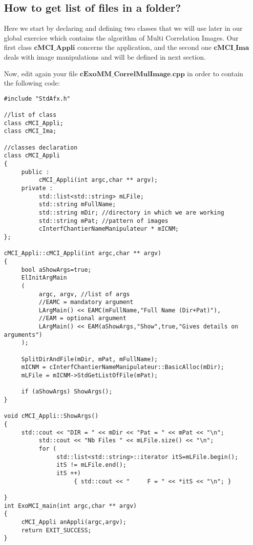\subsection{How to get list of files in a folder?}
Here we start by declaring and defining two classes that we will use later in our global exercice which contains the algorithm of Multi Correlation Images. Our first class $\textbf{cMCI\_Appli}$ concerns the application, and the second one $\textbf{cMCI\_Ima}$ deals with image manipulations and will be defined in next section. \newline

Now, edit again your file $\textbf{cExoMM\_CorrelMulImage.cpp}$ in order to contain the following code:

\begin{verbatim}
#include "StdAfx.h" 

//list of class 
class cMCI_Appli; 
class cMCI_Ima; 

//classes declaration 
class cMCI_Appli 
{ 
     public : 
          cMCI_Appli(int argc,char ** argv); 
     private : 
          std::list<std::string> mLFile; 
          std::string mFullName; 
          std::string mDir; //directory in which we are working 
          std::string mPat; //pattern of images 
          cInterfChantierNameManipulateur * mICNM; 
}; 

cMCI_Appli::cMCI_Appli(int argc,char ** argv) 
{ 
     bool aShowArgs=true; 
     ElInitArgMain 
     ( 
          argc, argv, //list of args
          //EAMC = mandatory argument 
          LArgMain() << EAMC(mFullName,"Full Name (Dir+Pat)"),
          //EAM = optional argument 
          LArgMain() << EAM(aShowArgs,"Show",true,"Gives details on arguments")
     ); 

     SplitDirAndFile(mDir, mPat, mFullName); 
     mICNM = cInterfChantierNameManipulateur::BasicAlloc(mDir); 
     mLFile = mICNM->StdGetListOfFile(mPat); 

     if (aShowArgs) ShowArgs(); 
} 

void cMCI_Appli::ShowArgs() 
{ 
     std::cout << "DIR = " << mDir << "Pat = " << mPat << "\n"; 
          std::cout << "Nb Files " << mLFile.size() << "\n";     
          for ( 
               std::list<std::string>::iterator itS=mLFile.begin(); 
               itS != mLFile.end(); 
               itS ++) 
                    { std::cout << "     F = " << *itS << "\n"; }
                     
}
int ExoMCI_main(int argc,char ** argv) 
{ 
     cMCI_Appli anAppli(argc,argv); 
     return EXIT_SUCCESS;
}
\end{verbatim}

